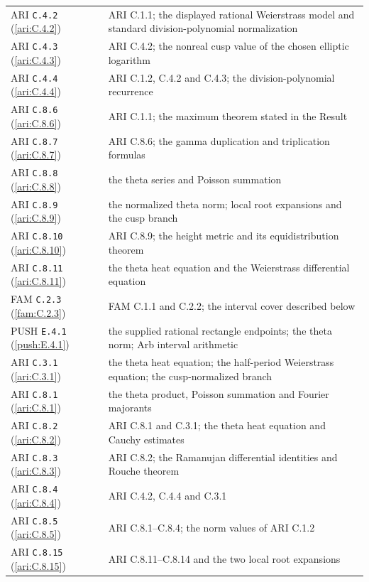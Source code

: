 \begin{longtable}{@{}L{.21\linewidth}L{.73\linewidth}@{}}
ARI \nolinkurl{C.4.2} (\ref{ari:C.4.2}) & ARI C.1.1; the displayed rational Weierstrass model and standard division-polynomial normalization\\
ARI \nolinkurl{C.4.3} (\ref{ari:C.4.3}) & ARI C.4.2; the nonreal cusp value of the chosen elliptic logarithm\\
ARI \nolinkurl{C.4.4} (\ref{ari:C.4.4}) & ARI C.1.2, C.4.2 and C.4.3; the division-polynomial recurrence\\
ARI \nolinkurl{C.8.6} (\ref{ari:C.8.6}) & ARI C.1.1; the maximum theorem stated in the Result\\
ARI \nolinkurl{C.8.7} (\ref{ari:C.8.7}) & ARI C.8.6; the gamma duplication and triplication formulas\\
ARI \nolinkurl{C.8.8} (\ref{ari:C.8.8}) & the theta series and Poisson summation\\
ARI \nolinkurl{C.8.9} (\ref{ari:C.8.9}) & the normalized theta norm; local root expansions and the cusp branch\\
ARI \nolinkurl{C.8.10} (\ref{ari:C.8.10}) & ARI C.8.9; the height metric and its equidistribution theorem\\
ARI \nolinkurl{C.8.11} (\ref{ari:C.8.11}) & the theta heat equation and the Weierstrass differential equation\\
FAM \nolinkurl{C.2.3} (\ref{fam:C.2.3}) & FAM C.1.1 and C.2.2; the interval cover described below\\
PUSH \nolinkurl{E.4.1} (\ref{push:E.4.1}) & the supplied rational rectangle endpoints; the theta norm; Arb interval arithmetic\\
ARI \nolinkurl{C.3.1} (\ref{ari:C.3.1}) & the theta heat equation; the half-period Weierstrass equation; the cusp-normalized branch\\
ARI \nolinkurl{C.8.1} (\ref{ari:C.8.1}) & the theta product, Poisson summation and Fourier majorants\\
ARI \nolinkurl{C.8.2} (\ref{ari:C.8.2}) & ARI C.8.1 and C.3.1; the theta heat equation and Cauchy estimates\\
ARI \nolinkurl{C.8.3} (\ref{ari:C.8.3}) & ARI C.8.2; the Ramanujan differential identities and Rouche theorem\\
ARI \nolinkurl{C.8.4} (\ref{ari:C.8.4}) & ARI C.4.2, C.4.4 and C.3.1\\
ARI \nolinkurl{C.8.5} (\ref{ari:C.8.5}) & ARI C.8.1–C.8.4; the norm values of ARI C.1.2\\
ARI \nolinkurl{C.8.15} (\ref{ari:C.8.15}) & ARI C.8.11–C.8.14 and the two local root expansions\\

\end{longtable}
